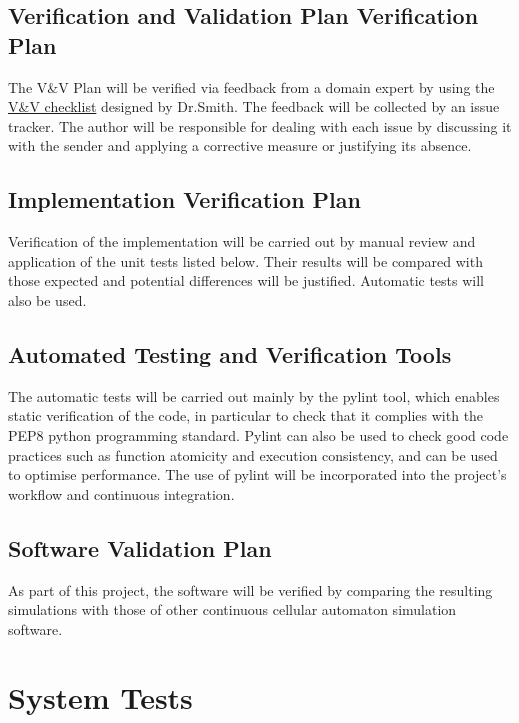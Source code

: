\documentclass[12pt, titlepage]{article}
\begin{document}
\subsection{Verification and Validation Plan Verification Plan}

The V\&V Plan will be verified via feedback from a domain expert by using the \href{https://github.com/BaptistePignier/CAS741-GameOfLife/blob/main/docs/Checklists/VnV-Checklist.pdf}{V\&V checklist} designed by Dr.Smith. The feedback will be collected by an issue tracker.
The author will be responsible for dealing with each issue by discussing it with the sender and applying a corrective measure or justifying its absence.

\subsection{Implementation Verification Plan}

Verification of the implementation will be carried out by manual review and application of the unit tests listed below. 
Their results will be compared with those expected and potential differences will be justified.
Automatic tests will also be used.

\subsection{Automated Testing and Verification Tools}

The automatic tests will be carried out mainly by the pylint tool, which enables static verification of the code, in particular to check that it complies with the PEP8 python programming standard.
Pylint can also be used to check good code practices such as function atomicity and execution consistency, and can be used to optimise performance.
The use of pylint will be incorporated into the project's workflow and continuous integration.

\subsection{Software Validation Plan}

As part of this project, the software will be verified by comparing the resulting simulations with those of other continuous cellular automaton simulation software.

\section{System Tests}
\end{document}
